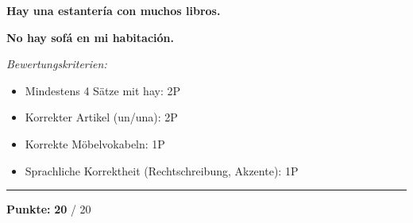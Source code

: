 \documentclass[11pt, a4paper]{article}
\newcommand{\maxpunkte}{20}
\newcommand{\loesung}[1]{\textcolor{loesung}{\textbf{#1}}}
\begin{document}
\loesung{Hay una estantería con muchos libros.}

\loesung{No hay sofá en mi habitación.}

\vspace{1em}

\textit{\textcolor{grau}{Bewertungskriterien:}}
\begin{itemize}
    \item \textcolor{grau}{Mindestens 4 Sätze mit hay: 2P}
    \item \textcolor{grau}{Korrekter Artikel (un/una): 2P}
    \item \textcolor{grau}{Korrekte Möbelvokabeln: 1P}
    \item \textcolor{grau}{Sprachliche Korrektheit (Rechtschreibung, Akzente): 1P}
\end{itemize}


\vspace{20pt}
\hrule
\vspace{10pt}

\begin{flushright}
\textbf{Punkte:} \loesung{\maxpunkte} / \maxpunkte
\end{flushright}
\end{document}
